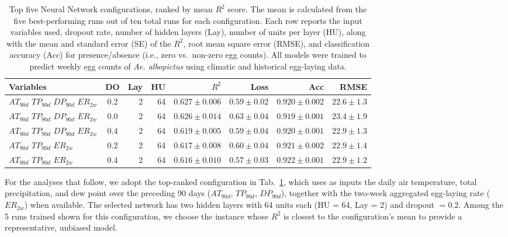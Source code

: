 \documentclass[preprint,12pt]{elsarticle}
\begin{document}
\begin{table}
\centering
\footnotesize
\caption{Top five Neural Network configurations, ranked by mean $R^2$
 score. The mean is calculated from the five best-performing runs out of ten total runs for each configuration.
Each row reports the input variables used, dropout rate, number of hidden layers (Lay), number of units per layer (HU), along with the mean and standard error (SE) of the $R^2$, root mean square error (RMSE), and classification accuracy (Acc) for presence/absence (i.e., zero vs.~non-zero egg counts). All models were trained to predict weekly egg counts of \emph{Ae. albopictus} using climatic and historical egg-laying data.}
\label{tab:top5models}
\begin{tabular}{lcrrrrrr}
\toprule
Variables & DO & Lay & HU & $R^2$ & Loss & Acc & RMSE \\
\midrule
$AT_{90d}$\,\text{+}\,$TP_{90d}$\,\text{+}\,$DP_{90d}$\,\text{+}\,$ER_{2w}$ & 0.2 & 2 & 64 & $0.627 \pm 0.006$ & $0.59 \pm 0.02$ & $0.920 \pm 0.002$ & $22.6 \pm 1.3$ \\
$AT_{90d}$\,\text{+}\,$TP_{90d}$\,\text{+}\,$DP_{90d}$\,\text{+}\,$ER_{2w}$ & 0.0 & 2 & 64 & $0.626 \pm 0.014$ & $0.63 \pm 0.04$ & $0.919 \pm 0.001$ & $23.4 \pm 1.9$ \\
$AT_{90d}$\,\text{+}\,$TP_{90d}$\,\text{+}\,$DP_{90d}$\,\text{+}\,$ER_{2w}$ & 0.4 & 2 & 64 & $0.619 \pm 0.005$ & $0.59 \pm 0.04$ & $0.920 \pm 0.001$ & $22.9 \pm 1.3$ \\
$AT_{90d}$\,\text{+}\,$TP_{90d}$\,\text{+}\,$ER_{2w}$ & 0.2 & 2 & 64 & $0.617 \pm 0.008$ & $0.60 \pm 0.04$ & $0.921 \pm 0.002$ & $22.9 \pm 1.4$ \\
$AT_{90d}$\,\text{+}\,$TP_{90d}$\,\text{+}\,$ER_{2w}$ & 0.4 & 2 & 64 & $0.616 \pm 0.010$ & $0.57 \pm 0.03$ & $0.922 \pm 0.001$ & $22.9 \pm 1.2$ \\
\bottomrule
\end{tabular}
\end{table}

For the analyses that follow, we adopt the top-ranked configuration in Tab.~\ref{tab:top5models}, which uses as inputs the daily air temperature, total precipitation, and dew point over the preceding 90 days ($AT_{90d}$, $TP_{90d}$, $DP_{90d}$), together with the two-week aggregated egg-laying rate ($ER_{2w}$) when available. The selected network has two hidden layers with 64 units each (HU = 64, Lay = 2) and dropout $=0.2$. Among the 5 runs trained shown for this configuration, we choose the instance whose $R^2$ is closest to the configuration’s mean to provide a representative, unbiased model.
\end{document}
